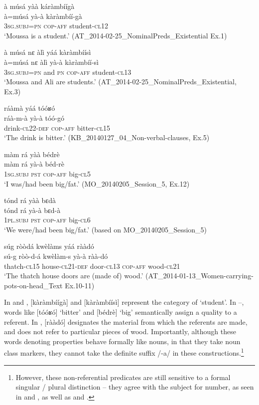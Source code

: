 \documentclass[output=paper]{langsci/langscibook}
\begin{document}
\ea\label{ex:teo:34}
 à músá yàà káràmbíígà\\
\gll  à=músá yà-à kàràmbíí-gà\\
 \textsc{3sg.subj=pn} \textsc{cop-aff} student-\textsc{cl12}\\
\glt ‘Moussa is a student.’ (AT\_2014-02-25\_NominalPreds\_Existential Ex.1)
\z

\ea\label{ex:teo:35}

à músá nɛ àlì yáá kàràmbíísì\\
\gll à=músá nɛ àlì yà-à kàràmbíí-sì\\
\textsc{3sg.subj=pn} and \textsc{pn}  \textsc{cop-aff} student-\textsc{cl}13\\
\glt ‘Moussa and Ali are students.’ (AT\_2014-02-25\_NominalPreds\_Existential, Ex.3)
\z

\ea\label{ex:teo:36}
ráàmà yáá tóóʁó\\
\gll ráà-m-à yà-à tóó-gó\\
drink-\textsc{cl22-def} \textsc{cop-aff} bitter-\textsc{cl15}\\
\glt ‘The drink is bitter.’ (KB\_20140127\_04\_Non-verbal-clauses, Ex.5)
\z

\ea\label{ex:teo:37}
màm rá yàà bédrè\\
\gll màm rá yà-à béd-rè\\
\textsc{1sg.subj} \textsc{pst} \textsc{cop-aff} big-\textsc{cl5}\\
\glt ‘I was/had been big/fat.’ (MO\_20140205\_Session\_5, Ex.12)
\z

\ea\label{ex:teo:38}
tónd rá yàà bɛdà\\
\gll tónd rá yà-à bɛd-à\\
\textsc{1pl.subj} \textsc{pst} \textsc{cop-aff} big-\textsc{cl6}\\
\glt ‘We were/had been big/fat.’ (based on MO\_20140205\_Session\_5)
\z

\ea\label{ex:teo:39}
súg ròòdá kwèlàms yáá rààdó\\
\gll sú-g ròò-d-á kwèlàm-s yà-à ràà-dó\\
thatch-\textsc{cl15} house-\textsc{cl21}-\textsc{def} door-\textsc{cl13} \textsc{cop-aff} wood-\textsc{cl21}\\
\glt ‘The thatch house doors are (made of) wood.’ (AT\_2014-01-13\_Women-carrying-pots-on-head\_Text Ex.10-11)
\z

In  and  , [kàràmbíígà] and [kàràmbíísì] represent the category of ‘student’. In –, words like [tóóʁó] ‘bitter’ and [bédrè] ‘big’ semantically assign a quality to a referent. In , [rààdó] designates the material from which the referents are made, and does not refer to particular pieces of wood. Importantly, although these words denoting properties behave formally like nouns, in that they take noun class markers, they cannot take the definite suffix /-a/ in these constructions.\footnote{However, these non-referential predicates are still sensitive to a formal singular / plural distinction – they agree with the subject for number, as seen in  and , as well as  and .}
\end{document}

